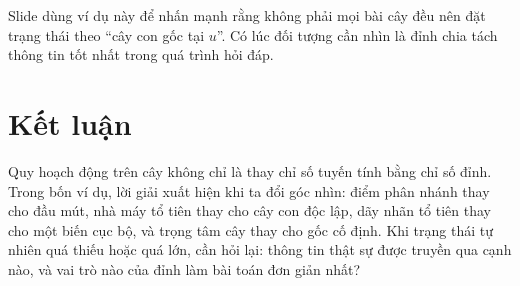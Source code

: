 \documentclass[11pt]{article}
\begin{document}
Slide dùng ví dụ này để nhấn mạnh rằng không phải mọi bài cây đều nên đặt
trạng thái theo ``cây con gốc tại \(u\)''. Có lúc đối tượng cần nhìn là đỉnh
chia tách thông tin tốt nhất trong quá trình hỏi đáp.

\section{Kết luận}

Quy hoạch động trên cây không chỉ là thay chỉ số tuyến tính bằng chỉ số đỉnh.
Trong bốn ví dụ, lời giải xuất hiện khi ta đổi góc nhìn: điểm phân nhánh thay
cho đầu mút, nhà máy tổ tiên thay cho cây con độc lập, dãy nhãn tổ tiên thay
cho một biến cục bộ, và trọng tâm cây thay cho gốc cố định. Khi trạng thái tự
nhiên quá thiếu hoặc quá lớn, cần hỏi lại: thông tin thật sự được truyền qua
cạnh nào, và vai trò nào của đỉnh làm bài toán đơn giản nhất?
\end{document}
